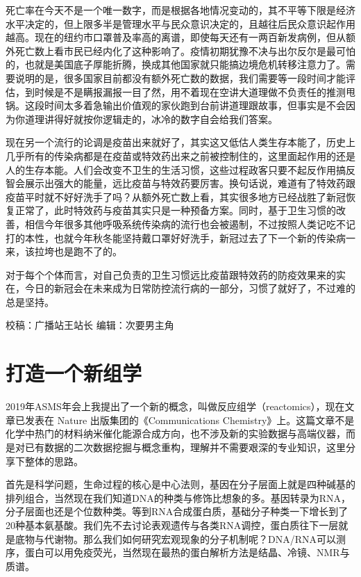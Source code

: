 \documentclass[
]{book}
\begin{document}
死亡率在今天不是一个唯一数字，而是根据各地情况变动的，其不平等下限是经济水平决定的，但上限多半是管理水平与民众意识决定的，且越往后民众意识起作用越高。现在的纽约市口罩普及率高的离谱，即使每天还有一两百新发病例，但从额外死亡数上看市民已经内化了这种影响了。疫情初期犹豫不决与出尔反尔是最可怕的，也就是美国底子厚能折腾，换成其他国家就只能搞边境危机转移注意力了。需要说明的是，很多国家目前都没有额外死亡数的数据，我们需要等一段时间才能评估，到时候是不是瞒报漏报一目了然，用不着现在空讲大道理做不负责任的推测甩锅。这段时间太多着急输出价值观的家伙跑到台前讲道理跟故事，但事实是不会因为你道理讲得好就按你逻辑走的，冰冷的数字自会给我们答案。

现在另一个流行的论调是疫苗出来就好了，其实这又低估人类生存本能了，历史上几乎所有的传染病都是在疫苗或特效药出来之前被控制住的，这里面起作用的还是人的生存本能。人们会改变不卫生的生活习惯，这些过程政客只要不起反作用搞反智会展示出强大的能量，远比疫苗与特效药要厉害。换句话说，难道有了特效药跟疫苗平时就不好好洗手了吗？从额外死亡数上看，其实很多地方已经战胜了新冠恢复正常了，此时特效药与疫苗其实只是一种预备方案。同时，基于卫生习惯的改善，相信今年很多其他呼吸系统传染病的流行也会被遏制，不过按照人类记吃不记打的本性，也就今年秋冬能坚持戴口罩好好洗手，新冠过去了下一个新的传染病一来，该拉垮也是跑不了的。

对于每个个体而言，对自己负责的卫生习惯远比疫苗跟特效药的防疫效果来的实在，今日的新冠会在未来成为日常防控流行病的一部分，习惯了就好了，不过难的总是坚持。

校稿：广播站王站长
编辑：次要男主角

\hypertarget{ux6253ux9020ux4e00ux4e2aux65b0ux7ec4ux5b66}{%
\section{打造一个新组学}\label{ux6253ux9020ux4e00ux4e2aux65b0ux7ec4ux5b66}}

2019年ASMS年会上我提出了一个新的概念，叫做反应组学（reactomics），现在文章已发表在 Nature 出版集团的《Communications Chemistry》上。这篇文章不是化学中热门的材料纳米催化能源合成方向，也不涉及新的实验数据与高端仪器，而是对已有数据的二次数据挖掘与概念重构，理解并不需要艰深的专业知识，这里分享下整体的思路。

首先是科学问题，生命过程的核心是中心法则，基因在分子层面上就是四种碱基的排列组合，当然现在我们知道DNA的种类与修饰比想象的多。基因转录为RNA，分子层面也还是个位数种类。等到RNA合成蛋白质，基础分子种类一下增长到了20种基本氨基酸。我们先不去讨论表观遗传与各类RNA调控，蛋白质往下一层就是底物与代谢物。那么我们如何研究宏观现象的分子机制呢？DNA/RNA可以测序，蛋白可以用免疫荧光，当然现在最热的蛋白解析方法是结晶、冷镜、NMR与质谱。
\end{document}
